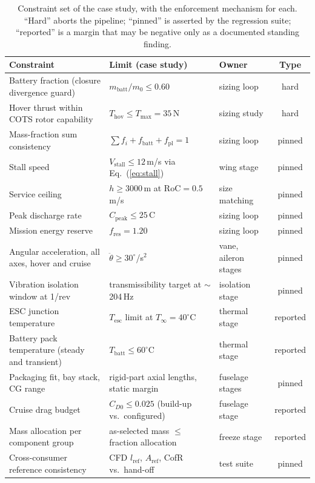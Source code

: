 \begin{table}[htbp]
\centering
\caption{Constraint set of the case study, with the enforcement
mechanism for each. ``Hard'' aborts the pipeline; ``pinned'' is
asserted by the regression suite; ``reported'' is a margin that may be
negative only as a documented standing finding.}
\label{tab:constraints}
\footnotesize
\begin{tabularx}{\textwidth}{@{}Xllc@{}}
\toprule
\textbf{Constraint} & \textbf{Limit (case study)} &
\textbf{Owner} & \textbf{Type} \\
\midrule
Battery fraction (closure divergence guard) &
$m_{\mathrm{batt}}/m_0 \le 0.60$ & sizing loop & hard \\
Hover thrust within COTS rotor capability &
$T_{\mathrm{hov}} \le T_{\max}=35$\,N & sizing study & hard \\
Mass-fraction sum consistency &
$\sum f_i + f_{\mathrm{batt}} + f_{\mathrm{pl}} = 1$ &
sizing loop & pinned \\
Stall speed &
$V_{\mathrm{stall}} \le 12$\,m/s via Eq.~(\ref{eq:stall}) &
wing stage & pinned \\
Service ceiling &
$h \ge 3000$\,m at $\mathrm{RoC}=0.5$\,m/s &
size matching & pinned \\
Peak discharge rate &
$C_{\mathrm{peak}} \le 25$\,C & sizing loop & pinned \\
Mission energy reserve &
$f_{\mathrm{res}} = 1.20$ & sizing loop & pinned \\
Angular acceleration, all axes, hover and cruise &
$\ddot\theta \ge 30^{\circ}$/s$^{2}$ & vane, aileron stages & pinned \\
Vibration isolation window at 1/rev &
transmissibility target at $\sim$204\,Hz & isolation stage & pinned \\
ESC junction temperature &
$T_{\mathrm{esc}}$ limit at $T_\infty=40^{\circ}$C &
thermal stage & reported \\
Battery pack temperature (steady and transient) &
$T_{\mathrm{batt}} \le 60^{\circ}$C & thermal stage & reported \\
Packaging fit, bay stack, CG range &
rigid-part axial lengths, static margin &
fuselage stages & pinned \\
Cruise drag budget &
$C_{D0} \le 0.025$ (build-up vs.\ configured) &
fuselage stage & reported \\
Mass allocation per component group &
as-selected mass $\le$ fraction allocation &
freeze stage & reported \\
Cross-consumer reference consistency &
CFD $l_{\mathrm{ref}}$, $A_{\mathrm{ref}}$, CofR vs.\ hand-off &
test suite & pinned \\
\bottomrule
\end{tabularx}
\end{table}

